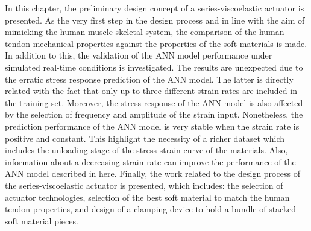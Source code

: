 In this chapter, the preliminary design concept of a series-viscoelastic actuator is presented. As the very first step in the design process and in line with the aim of mimicking the human muscle skeletal system, the comparison of the human tendon mechanical properties against the properties of the soft materials is made. In addition to this, the validation of the ANN model performance under simulated real-time conditions is investigated. The results are unexpected due to the erratic stress response prediction of the ANN model. The latter is directly related with the fact that only up to three different strain rates are included in the training set. Moreover, the stress response of the ANN model is also affected by the selection of frequency and amplitude of the strain input. Nonetheless, the prediction performance of the ANN model is very stable when the strain rate is positive and constant. This highlight the necessity of a richer dataset which includes the unloading stage of the stress-strain curve of the materials. Also, information about a decreasing strain rate can improve the performance of the ANN model described in here. Finally, the work related to the design process of the series-viscoelastic actuator is presented, which includes: the selection of actuator technologies, selection of the best soft material to match the human tendon properties, and design of a clamping device to hold a bundle of stacked soft material pieces.